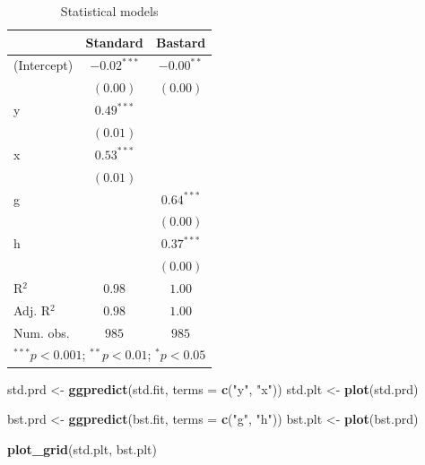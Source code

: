 \documentclass[10pt]{article}
\newenvironment{Shaded}{\begin{snugshade}}{\end{snugshade}}
\newcommand{\AttributeTok}[1]{\textcolor[rgb]{0.13,0.29,0.53}{#1}}
\newcommand{\FunctionTok}[1]{\textcolor[rgb]{0.13,0.29,0.53}{\textbf{#1}}}
\newcommand{\NormalTok}[1]{#1}
\newcommand{\OtherTok}[1]{\textcolor[rgb]{0.56,0.35,0.01}{#1}}
\newcommand{\StringTok}[1]{\textcolor[rgb]{0.31,0.60,0.02}{#1}}
\begin{document}
\begin{table}
\caption{Statistical models}
\begin{center}
\begin{tabular}{l c c}
\hline
 & Standard & Bastard \\
\hline
(Intercept) & $-0.02^{***}$ & $-0.00^{**}$ \\
            & $(0.00)$      & $(0.00)$     \\
y           & $0.49^{***}$  &              \\
            & $(0.01)$      &              \\
x           & $0.53^{***}$  &              \\
            & $(0.01)$      &              \\
g           &               & $0.64^{***}$ \\
            &               & $(0.00)$     \\
h           &               & $0.37^{***}$ \\
            &               & $(0.00)$     \\
\hline
R$^2$       & $0.98$        & $1.00$       \\
Adj. R$^2$  & $0.98$        & $1.00$       \\
Num. obs.   & $985$         & $985$        \\
\hline
\multicolumn{3}{l}{\scriptsize{$^{***}p<0.001$; $^{**}p<0.01$; $^{*}p<0.05$}}
\end{tabular}
\label{table:coefficients}
\end{center}
\end{table}

\begin{Shaded}
\begin{Highlighting}[]
\NormalTok{std.prd }\OtherTok{\textless{}{-}} \FunctionTok{ggpredict}\NormalTok{(std.fit, }\AttributeTok{terms =} \FunctionTok{c}\NormalTok{(}\StringTok{"y"}\NormalTok{, }\StringTok{"x"}\NormalTok{))}
\NormalTok{std.plt }\OtherTok{\textless{}{-}} \FunctionTok{plot}\NormalTok{(std.prd) }

\NormalTok{bst.prd }\OtherTok{\textless{}{-}} \FunctionTok{ggpredict}\NormalTok{(bst.fit, }\AttributeTok{terms =} \FunctionTok{c}\NormalTok{(}\StringTok{"g"}\NormalTok{, }\StringTok{"h"}\NormalTok{))}
\NormalTok{bst.plt }\OtherTok{\textless{}{-}} \FunctionTok{plot}\NormalTok{(bst.prd)}

\FunctionTok{plot\_grid}\NormalTok{(std.plt, bst.plt)}
\end{Highlighting}
\end{Shaded}
\end{document}
